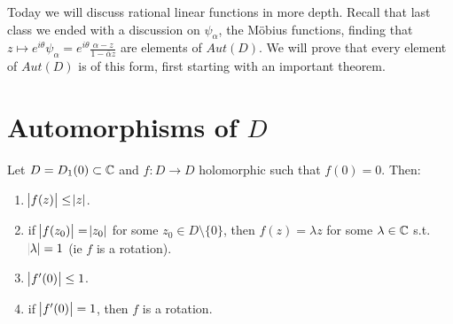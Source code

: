\setcounter{section}{0}
\setcounter{theorem}{0}



Today we will discuss rational linear functions in more depth. Recall that last class we ended with a discussion on $\psi_\alpha$, the M{\"o}bius functions, finding that $z \mapsto e^{i \theta} \psi_\alpha = e^{i \theta} \frac{\alpha - z}{ 1 - \overline{\alpha} z}$ are elements of $Aut(D)$. We will prove that every element of $Aut(D)$ is of this form, first starting with an important theorem.

\section{Automorphisms of $D$}

\begin{theorem}\label{thm:schwarz-lemma}
Let $D = D_1(0) \subset \mathbb{C}$ and $f: D \to D$ holomorphic such that $f(0) = 0$. Then:
\begin{enumerate}
    \item $\abs{f(z)} \leq \abs{z}$.
    \item if $\abs{f(z_0)} = \abs{z_0}$ for some $z_0 \in D \setminus \{ 0 \}$, then $f (z) = \lambda z$ for some $\lambda \in \mathbb{C}$ s.t. $\abs{\lambda} = 1$ (ie $f$ is a rotation).
    \item  $\abs{f'(0)} \leq 1$.
    \item if $\abs{f'(0)} = 1$, then $f$ is a rotation.
\end{enumerate}


\end{theorem}







